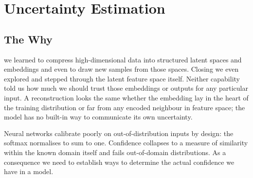 
\chapter{Uncertainty Estimation}


\section{The Why}



 we learned to compress high-dimensional data into structured latent spaces and embeddings
and even to draw new samples from those spaces. Closing we even explored and stepped through the latent feature space itself.
Neither capability told us how much we should trust those embeddings or outputs for any particular input.
A reconstruction looks the same whether the embedding lay in the heart of the training distribution or far from any encoded
neighbour in feature space; the model has no built-in way to communicate its own uncertainty.




Neural networks calibrate poorly on out-of-distribution inputs by design: the softmax normalises to sum to one.
Confidence collapses to a measure of similarity within the known domain itself and fails out-of-domain distributions.
As a consequence we need to establish ways to determine the actual confidence we have in a model.


